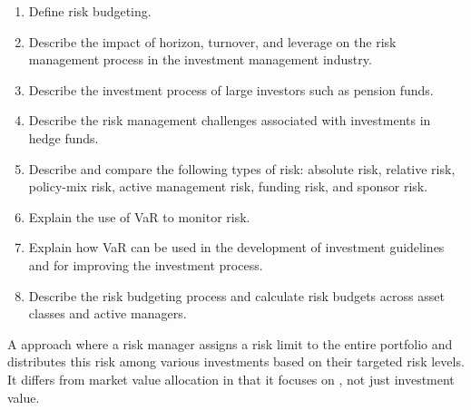 

\begin{imkeybox}[title={The eight objectives in this reading}]
\begin{enumerate}[label=\textbf{\alph*.}]
\item Define risk budgeting.
\item Describe the impact of horizon, turnover, and leverage on the risk management process in the investment management industry.
\item Describe the investment process of large investors such as pension funds.
\item Describe the risk management challenges associated with investments in hedge funds.
\item Describe and compare the following types of risk: absolute risk, relative risk, policy-mix risk, active management risk, funding risk, and sponsor risk.
\item Explain the use of VaR to monitor risk.
\item Explain how VaR can be used in the development of investment guidelines and for improving the investment process.
\item Describe the risk budgeting process and calculate risk budgets across asset classes and active managers.
\end{enumerate}
\end{imkeybox}


\begin{imdefbox}[title={Risk budgeting}]
A  approach where a risk manager assigns a risk limit to the
entire portfolio and distributes this risk among various investments based on
their targeted risk levels. It differs from market value allocation in that it
focuses on , not just investment value.
\end{imdefbox}


